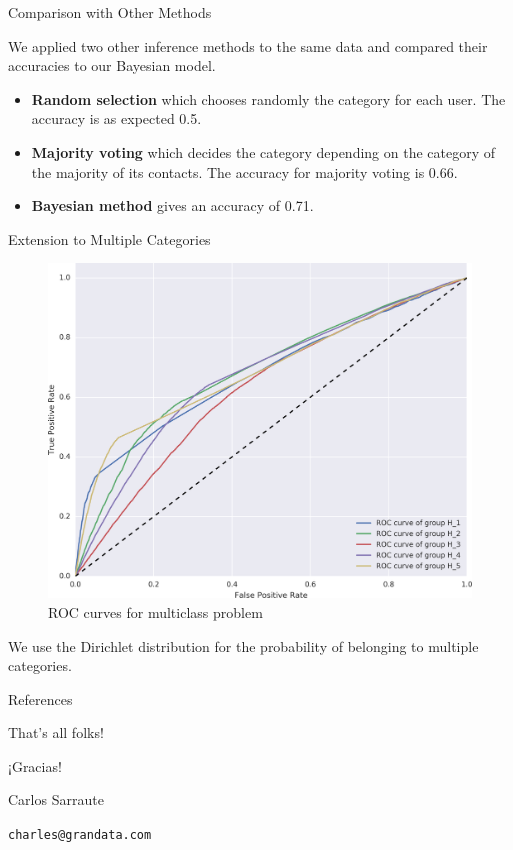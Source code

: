 \documentclass{beamer}
\newcommand{\AUC}{\operatorname{AUC}}
\begin{document}
\begin{frame}{Comparison with Other Methods}

We applied two other inference methods to the same data and compared their accuracies to our Bayesian model.

\begin{itemize}
	\item \textbf{Random selection} which chooses randomly the category for each user.
	The accuracy is as expected \num{0.5}.
	\item \textbf{Majority voting} which decides the category depending on the category of the majority of its contacts.
	The accuracy for majority voting is \num{0.66}.
	\item \textbf{Bayesian method} gives an accuracy of \num{0.71}.
\end{itemize}

\end{frame}


\begin{frame}{Extension to Multiple Categories}

\begin{figure}[h]
\begin{center}
\includegraphics[width=0.6\columnwidth]{figures/ROC_multiclass/ROC_multiclass.png}
\caption{ROC curves for multiclass problem}
\end{center}
\label{roc_multiple_categories}
\end{figure}

We use the Dirichlet distribution for the probability of belonging to multiple categories.

\end{frame}

\begin{frame}{References}
\justifying%


\end{frame}

\begin{frame}{That's all folks!}
\centering
\begin{huge}
¡Gracias!
\end{huge}

\bigskip
\bigskip
\begin{Large}

Carlos Sarraute

\bigskip

\texttt{charles@grandata.com}
\end{Large}

\end{frame}
\end{document}
